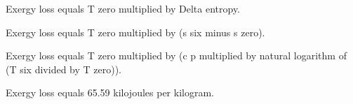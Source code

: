 Exergy loss equals T zero multiplied by Delta entropy.  

Exergy loss equals T zero multiplied by (s six minus s zero).  

Exergy loss equals T zero multiplied by (c p multiplied by natural logarithm of (T six divided by T zero)).  

Exergy loss equals 65.59 kilojoules per kilogram.
